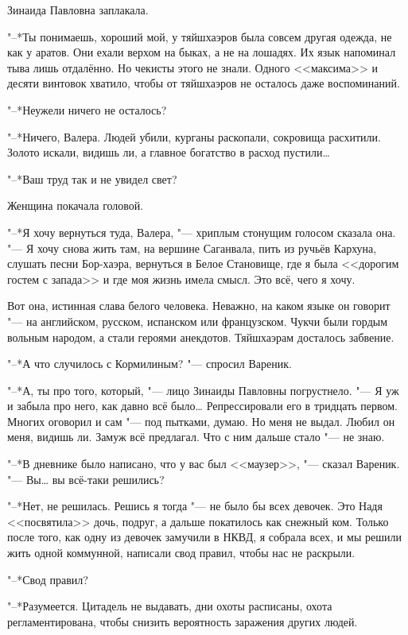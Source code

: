 Зинаида Павловна заплакала.

"--*Ты понимаешь, хороший мой, у тяйшхаэров была совсем другая одежда, не как у аратов.
Они ехали верхом на быках, а не на лошадях.
Их язык напоминал тыва лишь отдалённо.
Но чекисты этого не знали.
Одного <<максима>> и десяти винтовок хватило, чтобы от тяйшхаэров не осталось даже воспоминаний.

"--*Неужели ничего не осталось?

"--*Ничего, Валера.
Людей убили, курганы раскопали, сокровища расхитили.
Золото искали, видишь ли, а главное богатство в расход пустили\dots{}

"--*Ваш труд так и не увидел свет?

Женщина покачала головой.

"--*Я хочу вернуться туда, Валера, "--- хриплым стонущим голосом сказала она.
"--- Я хочу снова жить там, на вершине Саганвала, пить из ручьёв Кархуна, слушать песни Бор-хаэра, вернуться в Белое Становище, где я была <<дорогим гостем с запада>> и где моя жизнь имела смысл.
Это всё, чего я хочу.

Вот она, истинная слава белого человека.
Неважно, на каком языке он говорит "--- на английском, русском, испанском или французском.
Чукчи были гордым вольным народом, а стали героями анекдотов.
Тяйшхаэрам досталось забвение.

\asterism

"--*А что случилось с Кормилиным? "--- спросил Вареник.

"--*А, ты про того, который, "--- лицо Зинаиды Павловны погрустнело.
"--- Я уж и забыла про него, как давно всё было\dots{}
Репрессировали его в тридцать первом.
Многих оговорил и сам "--- под пытками, думаю.
Но меня не выдал.
Любил он меня, видишь ли.
Замуж всё предлагал.
Что с ним дальше стало "--- не знаю.

"--*В дневнике было написано, что у вас был <<маузер>>, "--- сказал Вареник.
"--- Вы\dots{} вы всё-таки решились?

"--*Нет, не решилась.
Решись я тогда "--- не было бы всех девочек.
Это Надя <<посвятила>> дочь, подруг, а дальше покатилось как снежный ком.
Только после того, как одну из девочек замучили в НКВД, я собрала всех, и мы решили жить одной коммунной, написали свод правил, чтобы нас не раскрыли.

"--*Свод правил?

"--*Разумеется.
Цитадель не выдавать, дни охоты расписаны, охота регламентирована, чтобы снизить вероятность заражения других людей.

